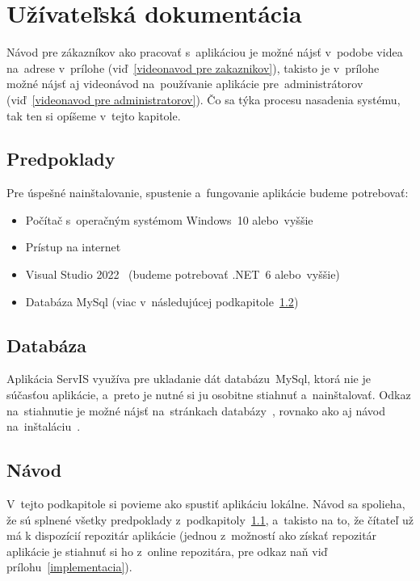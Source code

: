 \chapter{Užívateľská dokumentácia}

Návod pre zákazníkov ako pracovať s~aplikáciou je možné nájsť v~podobe videa na~adrese v~prílohe (viď~\ref{videonavod pre zakaznikov}), takisto je v~prílohe možné nájsť aj videonávod na~používanie aplikácie pre~administrátorov (viď~\ref{videonavod pre administratorov}). Čo sa týka procesu nasadenia systému, tak ten si opíšeme v~tejto kapitole.

\section{Predpoklady}
\label{predpoklady}

Pre úspešné nainštalovanie, spustenie a~fungovanie aplikácie budeme potrebovať:

\begin{itemize}
\item Počítač s~operačným systémom Windows~10 alebo~vyššie
\item Prístup na internet
\item Visual Studio 2022~\cite{visual studio} (budeme potrebovať .NET~6 alebo~vyššie)
\item Databáza MySql (viac v~následujúcej podkapitole~\ref{databaza})
\end{itemize}

\section{Databáza}
\label{databaza}

Aplikácia ServIS využíva pre ukladanie dát databázu~MySql, ktorá nie je súčasťou aplikácie, a~preto je nutné si ju osobitne stiahnuť a~nainštalovať. Odkaz na~stiahnutie je možné nájsť na~stránkach databázy~\cite{mysql}, rovnako ako aj návod na~inštaláciu~\cite{mysql navod}.

\section{Návod}

V~tejto podkapitole si povieme ako spustiť aplikáciu lokálne. Návod sa spolieha, že sú splnené všetky predpoklady z~podkapitoly~\ref{predpoklady}, a~takisto na to, že čítateľ už má k dispozícií repozitár aplikácie (jednou z~možností ako získať repozitár aplikácie je stiahnuť si ho z~online repozitára, pre odkaz naň viď prílohu~\ref{implementacia}).

